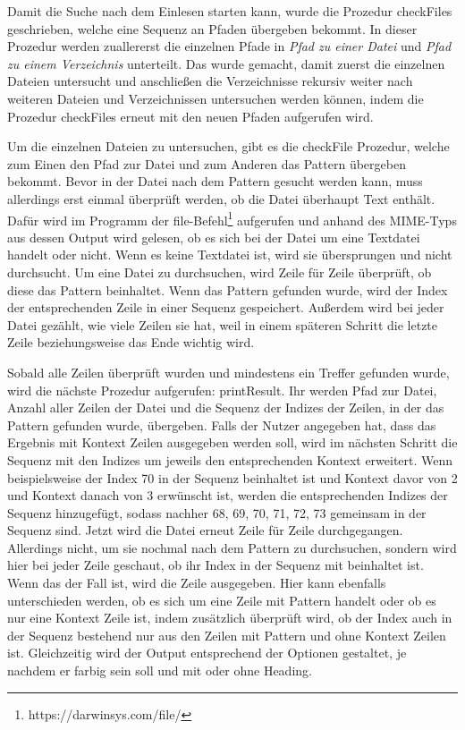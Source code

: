 \documentclass[11pt]{report}
\begin{document}
Damit die Suche nach dem Einlesen starten kann, wurde die Prozedur checkFiles geschrieben, welche eine Sequenz an Pfaden übergeben bekommt. In dieser Prozedur werden zuallererst die einzelnen Pfade in \emph{Pfad zu einer Datei} und \emph{Pfad zu einem Verzeichnis} unterteilt. Das wurde gemacht, damit zuerst die einzelnen Dateien untersucht und anschließen die Verzeichnisse rekursiv weiter nach weiteren Dateien und Verzeichnissen untersuchen werden können, indem die Prozedur checkFiles erneut mit den neuen Pfaden aufgerufen wird.

Um die einzelnen Dateien zu untersuchen, gibt es die checkFile Prozedur, welche zum Einen den Pfad zur Datei und zum Anderen das Pattern übergeben bekommt.
Bevor in der Datei nach dem Pattern gesucht werden kann, muss allerdings erst einmal überprüft werden, ob die Datei überhaupt Text enthält. Dafür wird im Programm der file-Befehl\footnote{https://darwinsys.com/file/} aufgerufen und anhand des MIME-Typs aus dessen Output wird gelesen, ob es sich bei der Datei um eine Textdatei handelt oder nicht. Wenn es keine Textdatei ist, wird sie übersprungen und nicht durchsucht.
\newline
Um eine Datei zu durchsuchen, wird Zeile für Zeile überprüft, ob diese das Pattern beinhaltet. Wenn das Pattern gefunden wurde, wird der Index der entsprechenden Zeile in einer Sequenz gespeichert. Außerdem wird bei jeder Datei gezählt, wie viele Zeilen sie hat, weil in einem späteren Schritt die letzte Zeile beziehungsweise das Ende wichtig wird.

Sobald alle Zeilen überprüft wurden und mindestens ein Treffer gefunden wurde, wird die nächste Prozedur aufgerufen: printResult. Ihr werden Pfad zur Datei, Anzahl aller Zeilen der Datei und die Sequenz der Indizes der Zeilen, in der das Pattern gefunden wurde, übergeben. Falls der Nutzer angegeben hat, dass das Ergebnis mit Kontext Zeilen ausgegeben werden soll, wird im nächsten Schritt die Sequenz mit den Indizes um jeweils den entsprechenden Kontext erweitert.
\newline
Wenn beispielsweise der Index 70 in der Sequenz beinhaltet ist und Kontext davor von 2 und Kontext danach von 3 erwünscht ist, werden die entsprechenden Indizes der Sequenz hinzugefügt, sodass nachher 68, 69, 70, 71, 72, 73 gemeinsam in der Sequenz sind.
\newline
Jetzt wird die Datei erneut Zeile für Zeile durchgegangen. Allerdings nicht, um sie nochmal nach dem Pattern zu durchsuchen, sondern wird hier bei jeder Zeile geschaut, ob ihr Index in der Sequenz mit beinhaltet ist. Wenn das der Fall ist, wird die Zeile ausgegeben. Hier kann ebenfalls unterschieden werden, ob es sich um eine Zeile mit Pattern handelt oder ob es nur eine Kontext Zeile ist, indem zusätzlich überprüft wird, ob der Index auch in der Sequenz bestehend nur aus den Zeilen mit Pattern und ohne Kontext Zeilen ist.
Gleichzeitig wird der Output entsprechend der Optionen gestaltet, je nachdem er farbig sein soll und mit oder ohne Heading.
\end{document}
